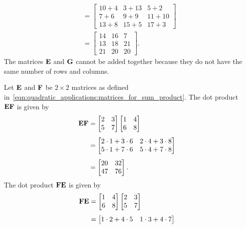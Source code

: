 \documentclass[a4paper,oneside,12pt]{article}
\begin{document}
\begin{problem}
{\begin{solution}
\begin{align*}
&=
\begin{bmatrix}
10 + 4 & 3 + 13 & 5 + 2   \\
7 + 6  & 9 + 9  & 11 + 10 \\
13 + 8 & 15 + 5 & 17 + 3
\end{bmatrix} \\[4pt]
&=
\begin{bmatrix}
14 & 16 & 7  \\
13 & 18 & 21 \\
21 & 20 & 20
\end{bmatrix}.
\end{align*}
The matrices $\textbf{E}$ and $\textbf{G}$ cannot be added together because they
do not have the same number of rows and columns.

Let $\textbf{E}$ and $\textbf{F}$ be $2 \times 2$ matrices as defined
in~\eqref{eqn:quadratic_applications:matrices_for_sum_product}.  The
dot product $\textbf{E} \textbf{F}$ is given by
\begin{align*}
\textbf{E} \textbf{F}
&=
\begin{bmatrix}
2 & 3 \\
5 & 7
\end{bmatrix}
\begin{bmatrix}
1 & 4 \\
6 & 8
\end{bmatrix} \\[4pt]
&=
\begin{bmatrix}
2 \cdot 1 + 3 \cdot 6 & 2 \cdot 4 + 3 \cdot 8 \\
5 \cdot 1 + 7 \cdot 6 & 5 \cdot 4 + 7 \cdot 8
\end{bmatrix} \\[4pt]
&=
\begin{bmatrix}
20 & 32 \\
47 & 76
\end{bmatrix}.
\end{align*}
The dot product $\textbf{F} \textbf{E}$ is given by
\begin{align*}
\textbf{F} \textbf{E}
&=
\begin{bmatrix}
1 & 4 \\
6 & 8
\end{bmatrix}
\begin{bmatrix}
2 & 3 \\
5 & 7
\end{bmatrix} \\[4pt]
&=
\begin{bmatrix}
1 \cdot 2 + 4 \cdot 5 & 1 \cdot 3 + 4 \cdot 7 \\

\end{bmatrix}
\end{align*}
\end{solution}}
\end{problem}
\end{document}
